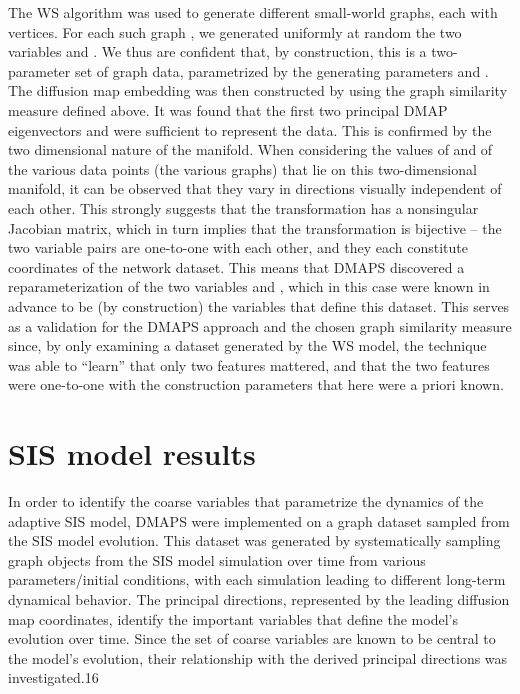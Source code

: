 The WS algorithm was used to generate different small-world graphs,
each with vertices. For each such graph , we generated uniformly at
random the two variables and . We thus are confident that, by
construction, this is a two-parameter set of graph data, parametrized
by the generating parameters and . The diffusion map embedding was
then constructed by using the graph similarity measure defined
above. It was found that the first two principal DMAP eigenvectors and
were sufficient to represent the data. This is confirmed by the two
dimensional nature of the manifold. When considering the values of and
of the various data points (the various graphs) that lie on this
two-dimensional manifold, it can be observed that they vary in
directions visually independent of each other. This strongly suggests
that the transformation has a nonsingular Jacobian matrix, which in
turn implies that the transformation is bijective – the two variable
pairs are one-to-one with each other, and they each constitute
coordinates of the network dataset. This means that DMAPS discovered a
reparameterization of the two variables and , which in this case were
known in advance to be (by construction) the variables that define
this dataset. This serves as a validation for the DMAPS approach and
the chosen graph similarity measure since, by only examining a dataset
generated by the WS model, the technique was able to “learn” that only
two features mattered, and that the two features were one-to-one with
the construction parameters that here were a priori known.

\section{SIS model results}

In order to identify the coarse variables that parametrize the
dynamics of the adaptive SIS model, DMAPS were implemented on a graph
dataset sampled from the SIS model evolution. This dataset was
generated by systematically sampling graph objects from the SIS model
simulation over time from various parameters/initial conditions, with
each simulation leading to different long-term dynamical behavior. The
principal directions, represented by the leading diffusion map
coordinates, identify the important variables that define the model's
evolution over time. Since the set of coarse variables are known to be
central to the model's evolution, their relationship with the derived
principal directions was investigated.16

